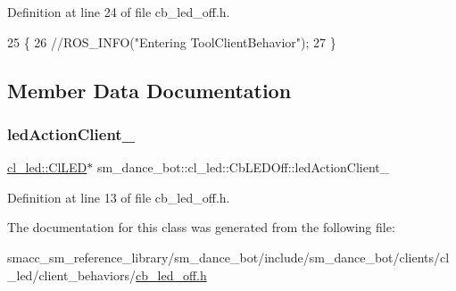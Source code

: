 Definition at line 24 of file cb\+\_\+led\+\_\+off.\+h.


\begin{DoxyCode}
25   \{
26     \textcolor{comment}{//ROS\_INFO("Entering ToolClientBehavior");}
27   \}
\end{DoxyCode}


\subsection{Member Data Documentation}
\mbox{\label{classsm__dance__bot_1_1cl__led_1_1CbLEDOff_a338a86c573b1b9c9cc4af9459145d68e}} 
\subsubsection{\texorpdfstring{led\+Action\+Client\+\_\+}{ledActionClient\_}}
{\footnotesize\ttfamily \hyperlink{classsm__dance__bot_1_1cl__led_1_1ClLED}{cl\+\_\+led\+::\+Cl\+L\+ED}$\ast$ sm\+\_\+dance\+\_\+bot\+::cl\+\_\+led\+::\+Cb\+L\+E\+D\+Off\+::led\+Action\+Client\+\_\+}



Definition at line 13 of file cb\+\_\+led\+\_\+off.\+h.



The documentation for this class was generated from the following file\+:\begin{DoxyCompactItemize}
\item 
smacc\+\_\+sm\+\_\+reference\+\_\+library/sm\+\_\+dance\+\_\+bot/include/sm\+\_\+dance\+\_\+bot/clients/cl\+\_\+led/client\+\_\+behaviors/\hyperlink{sm__dance__bot_2include_2sm__dance__bot_2clients_2cl__led_2client__behaviors_2cb__led__off_8h}{cb\+\_\+led\+\_\+off.\+h}\end{DoxyCompactItemize}
